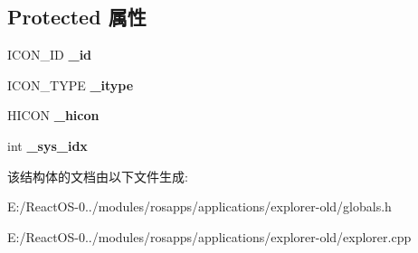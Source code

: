 \subsection*{Protected 属性}
\begin{DoxyCompactItemize}
\item 
\mbox{\label{struct_icon_ae68b06eab4ea0b5367cb064a48a48ae8}} 
I\+C\+O\+N\+\_\+\+ID {\bfseries \+\_\+id}
\item 
\mbox{\label{struct_icon_a4ce0751160abdd8d26491ac35b4e9b6c}} 
I\+C\+O\+N\+\_\+\+T\+Y\+PE {\bfseries \+\_\+itype}
\item 
\mbox{\label{struct_icon_ad25307395321f1809bc96aa1b44326b8}} 
H\+I\+C\+ON {\bfseries \+\_\+hicon}
\item 
\mbox{\label{struct_icon_afa3ab6060219689211aded3229cfe3f0}} 
int {\bfseries \+\_\+sys\+\_\+idx}
\end{DoxyCompactItemize}


该结构体的文档由以下文件生成\+:\begin{DoxyCompactItemize}
\item 
E\+:/\+React\+O\+S-\/0../modules/rosapps/applications/explorer-\/old/globals.\+h\item 
E\+:/\+React\+O\+S-\/0../modules/rosapps/applications/explorer-\/old/explorer.\+cpp\end{DoxyCompactItemize}
